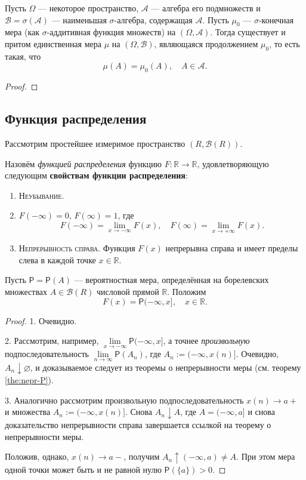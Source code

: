\begin{theorem}[Каратеодори]\label{the:carath}
  Пусть $ \Omega $ --- некоторое пространство, $ \mathscr A $ --- 
алгебра его подмножеств и $ \mathscr B = \sigma(\mathscr A) $ --- наименьшая $
\sigma $-алгебра, содержащая $ \mathscr A $. Пусть $ \mu_0 $ --- $ \sigma
$-конечная мера (как $ \sigma $-аддитивная функция множеств) на $ (\Omega,
\mathscr A) $. Тогда существует и притом единственная мера $ \mu $  на $ (\Omega, \mathscr B) $, являющаяся продолжением $ \mu_0
$, то есть такая, что 
\[
    \mu(A) = \mu_0(A), \quad A \in \mathscr A.
\]
\end{theorem}
\begin{proof}
\end{proof}


\subsection{Функция распределения}
Рассмотрим простейшее измеримое пространство $ (R, \mathscr B(R)) $. 

\begin{definition}
  Назовём \emph{функцией распределения} функцию $ F\colon \mathbb R \to \mathbb
  R $, удовлетворяющую следующим \textbf{свойствам функции распределения}:
  \begin{enumerate}
    \item \textsc{Неубывание}.
    \item $F(-\infty) = 0$, $ F(\infty) = 1 $, где 
    \[
      F(-\infty) = \lim_{x\to-\infty} F(x), \quad F(\infty) = \lim_{x\to+\infty}
      F(x).
    \]
  \item \textsc{Непрерывность справа}. Функция $ F(x) $ непрерывна справа и
    имеет пределы слева в каждой точке $ x \in \mathbb R $.
  \end{enumerate}
\end{definition}

Пусть $ \mathsf P = \mathsf P(A) $ --- вероятностная мера, определённая на
борелевских множествах $ A \in \mathscr B(R) $ числовой прямой $ \mathbb R $. Положим 
\[
  F(x) = \mathsf P(-\infty, x], \quad x \in \mathbb R.
\]
\begin{proof}
  1. Очевидно.

  2. Рассмотрим, например, $\lim\limits_{x\to-\infty} \mathsf P(-\infty, x]$, а
  точнее \textsl{произвольную} подпоследовательность $ \lim\limits_{n\to\infty}
  \mathsf P(A_n)$, где $A_n := (-\infty, x(n)]$. Очевидно, $ A_n \downarrow
  \varnothing $, и доказываемое следует из теоремы о непрерывности меры (см.
  теорему \ref{the:nepr-P}).

  3. Аналогично рассмотрим произвольную подпоследовательность $ x(n) \to a+ $ и множества $ A_n := (-\infty, x(n)] $. Снова $
  A_n \downarrow A $, где $ A =  (-\infty, a] $ и снова доказательство
  непрерывности справа
  завершается ссылкой на теорему о непрерывности меры.

  Положив, однако, $ x(n) \to a- $, получим $ A_n \uparrow (-\infty, a) \neq A
  $. При этом мера одной точки может быть и не равной нулю $ \mathsf P(\{a\}) >
  0$. 
\end{proof}

